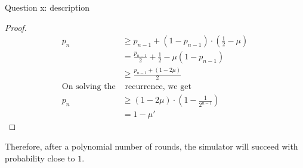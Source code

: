 \begin{solution}{Question x: description}
\begin{proof}
\begin{equation}
\begin{split}
                p_n &\geq p_{n-1} + (1-p_{n-1})\cdot\left(\frac{1}{2}-\mu\right)\\
                &= \frac{p_{n-1}}{2} + \frac{1}{2} - \mu(1 - p_{n-1})\\
                &\geq \frac{p_{n-1} + (1 - 2\mu)}{2}\\
                \text{On solving the}&\text{ recurrence, we get}\\
                p_n &\geq (1 - 2\mu)\cdot\left(1 - \frac{1}{2^{n-1}}\right)\\
                    &= 1 - \mu'
            \end{split}
        \end{equation}
    \end{proof}
    Therefore, after a polynomial number of rounds, the simulator will succeed with probability close to $1$.
\end{solution}
